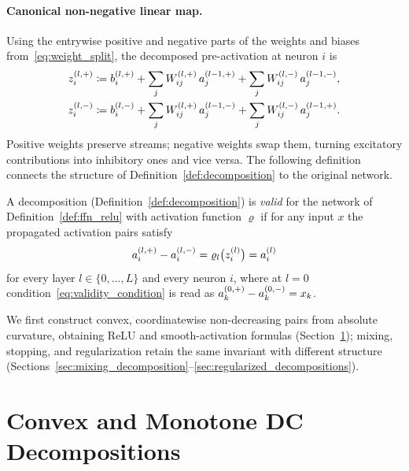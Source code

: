 \paragraph{Canonical non-negative linear map.}
Using the entrywise positive and negative parts of the weights and biases from~\eqref{eq:weight_split}, the decomposed pre-activation at neuron $i$ is
\begin{align}
	z^{(l,+)}_i &\coloneqq b_i^{(l,+)} + \sum_j W^{(l,+)}_{ij}\, a^{(l-1,+)}_j + \sum_j W^{(l,-)}_{ij}\, a^{(l-1,-)}_j,
	\label{eq:split_pos}\\
	z^{(l,-)}_i &\coloneqq b_i^{(l,-)} + \sum_j W^{(l,+)}_{ij}\, a^{(l-1,-)}_j + \sum_j W^{(l,-)}_{ij}\, a^{(l-1,+)}_j.
	\label{eq:split_neg}
\end{align}
Positive weights preserve streams; negative weights swap them, turning excitatory contributions into inhibitory ones and vice versa. The following definition connects the structure of Definition~\ref{def:decomposition} to the original network.

\begin{definition}\label{def:valid_decomposition}
A decomposition (Definition~\ref{def:decomposition}) is \emph{valid} for the network of Definition~\ref{def:ffn_relu} with activation function $\varrho$ if for any input $x$ the propagated activation pairs satisfy
\begin{equation}
	a^{(l,+)}_i - a^{(l,-)}_i = \varrho_l\bigl(z^{(l)}_i\bigr) = a^{(l)}_i
	\label{eq:validity_condition}
\end{equation}
for every layer $l \in \{0, \dots, L\}$ and every neuron $i$, where at $l = 0$ condition~\eqref{eq:validity_condition} is read as $a^{(0,+)}_k - a^{(0,-)}_k = x_k$.
\end{definition}

We first construct convex, coordinatewise non-decreasing pairs from absolute curvature, obtaining ReLU and smooth-activation formulas (Section~\ref{sec:dc_decompositions}); mixing, stopping, and regularization retain the same invariant with different structure (Sections~\ref{sec:mixing_decomposition}--\ref{sec:regularized_decompositions}).

\section{Convex and Monotone DC Decompositions}\label{sec:dc_decompositions}

